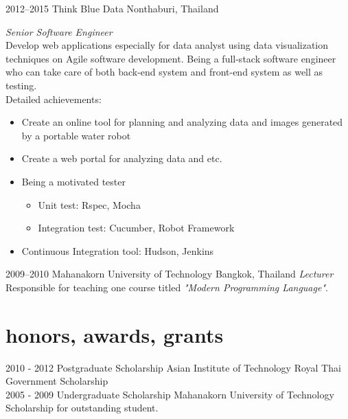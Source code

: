 \documentclass[]{friggeri-cv} %
\begin{document}
\begin{entrylist}
\entry
{2012--2015}
{Think Blue Data}
{Nonthaburi, Thailand}
{\emph{Senior Software Engineer} \\
Develop web applications especially for data analyst using data visualization techniques on Agile software development. Being a full-stack software engineer who can take care of both back-end system and front-end system as well as testing. \\
Detailed achievements:
\begin{itemize}
\item Create an online tool for planning and analyzing data and images generated by a portable water robot
\item Create a web portal for analyzing data and etc.
\item Being a motivated tester
\begin{itemize}
\item Unit test: Rspec, Mocha
\item Integration test: Cucumber, Robot Framework
\end{itemize}
\item Continuous Integration tool: Hudson, Jenkins\\
\end{itemize}
}

\entry
{2009--2010}
{Mahanakorn University of Technology}
{Bangkok, Thailand}
{\emph{Lecturer} \\
Responsible for teaching one course titled \emph{"Modern Programming Language"}.\\
}
\end{entrylist}


\section{honors, awards, grants}

\begin{entrylist}
\entry
{2010 - 2012}
{Postgraduate Scholarship}
{Asian Institute of Technology}
{Royal Thai Government Scholarship}
\\
\entry
{2005 - 2009}
{Undergraduate Scholarship}
{Mahanakorn University of Technology}
{Scholarship for outstanding student.}\\
\end{entrylist}
\end{document}
